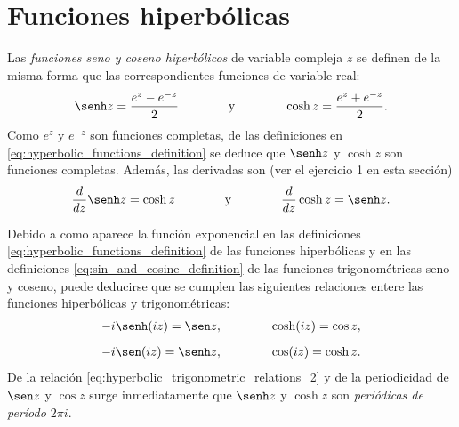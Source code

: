 \documentclass[a4paper]{report}
\begin{document}
\section{Funciones hiperbólicas}\label{sec:hyperbolic_functions}

Las \emph{funciones seno y coseno hiperbólicos} de variable compleja \(z\) se definen de la misma forma que las correspondientes funciones de variable real:
\begin{equation}\label{eq:hyperbolic_functions_definition}
 \senh z=\frac{e^z-e^{-z}}{2}
 \qquad\qquad\textrm{y}\qquad\qquad
 \cosh z=\frac{e^z+e^{-z}}{2}. 
\end{equation}
Como \(e^z\) y \(e^{-z}\) son funciones completas, de las definiciones en \ref{eq:hyperbolic_functions_definition} se deduce que \(\senh z\) y \(\cosh z\) son funciones completas. Además, las derivadas son (ver el ejercicio 1 en esta sección)
\begin{equation}\label{eq:sinh_cosh_derivatives}
 \frac{d}{dz}\senh z=\cosh z
 \qquad\qquad\textrm{y}\qquad\qquad
 \frac{d}{dz}\cosh z=\senh z. 
\end{equation}

Debido a como aparece la función exponencial en las definiciones \ref{eq:hyperbolic_functions_definition} de las funciones hiperbólicas y en las definiciones \ref{eq:sin_and_cosine_definition} de las funciones trigonométricas seno y coseno, puede deducirse que se cumplen las siguientes relaciones entere las funciones hiperbólicas y trigonométricas: 
\begin{gather}
  -i\senh(iz)=\sen z,\qquad\qquad\cosh(iz)=\cos z,\label{eq:hyperbolic_trigonometric_relations_1}\\[\medskipamount]
  -i\sen(iz)=\senh z,\qquad\qquad\cos(iz)=\cosh z.\label{eq:hyperbolic_trigonometric_relations_2}
\end{gather}
De la relación \ref{eq:hyperbolic_trigonometric_relations_2} y de la periodicidad de \(\sen z\) y \(\cos z\) surge inmediatamente que \(\senh z\) y \(\cosh z\) son \emph{periódicas de período \(2\pi i\)}.
\end{document}
